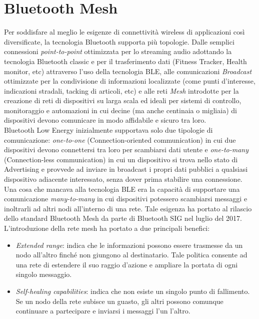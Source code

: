 \chapter{Bluetooth Mesh}
\label{ch:Ble_mesh}

Per soddisfare al meglio le esigenze di connettività wireless di applicazioni così diversificate, la tecnologia Bluetooth supporta più topologie. Dalle semplici connessioni \textit{point-to-point} ottimizzata per lo streaming audio adottando la tecnologia Bluetooth classic e per il trasferimento dati (Fitness Tracker, Health monitor, etc) attraverso l'uso della tecnologia BLE, alle comunicazioni \textit{Broadcast} ottimizzate per la condivisione di informazioni localizzate (come punti d'interesse, indicazioni stradali, tacking di articoli, etc) e alle reti \textit{Mesh} introdotte per la creazione di reti di dispositivi su larga scala ed ideali per sistemi di controllo, monitoraggio e automazioni in cui decine (ma anche centinaia o migliaia) di dispositivi devono comunicare in modo affidabile e sicuro tra loro.\\

\noindent Bluetooth Low Energy inizialmente supportava solo due tipologie di comunicazione: \textit{one-to-one} (Connection-oriented communication) in cui due dispositivi devono connettersi tra loro per scambiarsi dati utente e \textit{one-to-many} (Connection-less communication) in cui un dispositivo si trova nello stato di Advertising e provvede ad inviare in broadcast i propri dati pubblici a qualsiasi dispositivo adiacente interessato, senza dover prima stabilire una connessione.\\
Una cosa che mancava alla tecnologia BLE era la capacità di supportare una comunicazione \textit{many-to-many} in cui dispositivi potessero scambiarsi messaggi e inoltrarli ad altri nodi all'interno di una rete. Tale esigenza ha portato al rilascio dello standard Bluetooth Mesh da parte di Bluetooth SIG nel luglio del 2017.\\

\noindent L'introduzione della rete mesh ha portato a due principali benefici:
\begin{itemize}
    \item \textit{Extended range}: indica che le informazioni possono essere trasmesse da un nodo all'altro finché non giungono al destinatario. Tale politica consente ad una rete di estendere il suo raggio d'azione e ampliare la portata di ogni singolo messaggio.
    
    \item \textit{Self-healing capabilities}: indica che non esiste un singolo punto di fallimento. Se un nodo della rete subisce un guasto, gli altri possono comunque continuare a partecipare e inviarsi i messaggi l'un l'altro.
\end{itemize}

